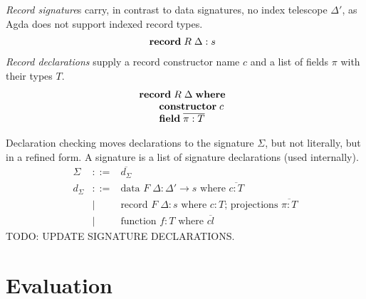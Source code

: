 \documentclass[acmlarge,fleqn]{acmart}\settopmatter{}
\renewcommand{\|}{\mid}
\begin{document}
\emph{Record signature}s carry, in contrast to data signatures,
no index telescope $\Delta'$, as Agda does not support indexed record types.
\[
\begin{array}{@{}l}
\textbf{record}\; R\; \Delta : s
\end{array}
\]
\emph{Record declarations} supply a record constructor name $c$
and a list of fields $\pi$ with their types $T$.
\[
\begin{array}{@{}l}
\textbf{record}\; R\; \Delta \; \textbf{where} \\
\qquad  \textbf{constructor}\; c \\
\qquad  \textbf{field}\; \overline{\pi : T} \\
\end{array}
\]

\newcommand{\datasig}{\text{data } F\; \Delta : \Delta' \to s \text{ where } \overline{c : T}}
\newcommand{\recsig}{\text{record } F\;\Delta : s \text{ where
    $c : T$; } \text{projections } \overline{\pi : T} }
\newcommand{\funsig}{\text{function } f : T \text{ where } \overline{cl}}

Declaration checking moves declarations to the signature $\Sigma$,
but not literally, but in a refined form.
A signature is a list of signature declarations (used internally).
\[
\begin{array}{lcl}
\Sigma & ::= &  \overline{d_\Sigma} \\
d_\Sigma & ::= & \datasig \\
& \| & \recsig \\
& \| & \funsig
\end{array}
\]
TODO: UPDATE SIGNATURE DECLARATIONS.


\section{Evaluation}
\label{sec:evaluation}
\end{document}
